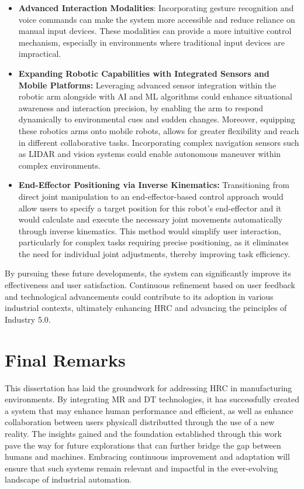 \begin{itemize}
    \item \textbf{Advanced Interaction Modalities}: Incorporating gesture recognition and voice commands can make the system more accessible and reduce reliance on manual input devices. These modalities can provide a more intuitive control mechanism, especially in environments where traditional input devices are impractical.
    \item \textbf{Expanding Robotic Capabilities with Integrated Sensors and Mobile Platforms:} Leveraging advanced sensor integration within the robotic arm alongside with \ac{AI} and \ac{ML} algorithms could enhance situational awareness and interaction precision, by enabling the arm to respond dynamically to environmental cues and sudden changes. Moreover, equipping these robotics arms onto mobile robots, allows for greater flexibility and reach in different collaborative tasks. Incorporating complex navigation sensors such as \ac{LIDAR} and vision systems could enable autonomous maneuver within complex environments.
    \item \textbf{End-Effector Positioning via Inverse Kinematics:} Transitioning from direct joint manipulation to an end-effector-based control approach would allow users to specify a target position for this robot’s end-effector and it would calculate and execute the necessary joint movements automatically through inverse kinematics. This method would simplify user interaction, particularly for complex tasks requiring precise positioning, as it eliminates the need for individual joint adjustments, thereby improving task efficiency. 

\end{itemize}

By pursuing these future developments, the system can significantly improve its effectiveness and user satisfaction. Continuous refinement based on user feedback and technological advancements could contribute to its adoption in various industrial contexts, ultimately enhancing \ac{HRC} and advancing the principles of Industry 5.0.

\section{Final Remarks}

This dissertation has laid the groundwork for addressing \ac{HRC} in manufacturing environments. By integrating \ac{MR} and \ac{DT} technologies, it has successfully created a system that may enhance human performance and efficient, as well as enhance collaboration between users physicall distributted through the use of a new reality. The insights gained and the foundation established through this work pave the way for future explorations that can further bridge the gap between humans and machines. Embracing continuous improvement and adaptation will ensure that such systems remain relevant and impactful in the ever-evolving landscape of industrial automation.